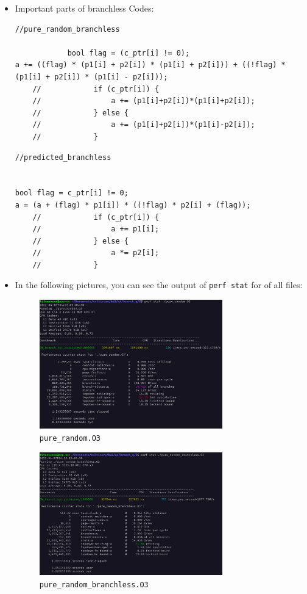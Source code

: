 \documentclass[12pt]{article}
\begin{document}
	\begin{itemize}
		\item 
			Important parts of branchless Codes:
		
		
		\begin{lstlisting}[style=CStyle]
			//pure_random_branchless
			
            bool flag = (c_ptr[i] != 0);
a += ((flag) * (p1[i] + p2[i]) * (p1[i] + p2[i])) + ((!flag) * (p1[i] + p2[i]) * (p1[i] - p2[i]));
	//            if (c_ptr[i]) {
	//                a += (p1[i]+p2[i])*(p1[i]+p2[i]);
	//            } else {
	//                a += (p1[i]+p2[i])*(p1[i]-p2[i]);
	//            }
		\end{lstlisting}
		
		
		\begin{lstlisting}[style=CStyle]
			//predicted_branchless
			

bool flag = c_ptr[i] != 0;
a = (a + (flag) * p1[i]) * ((!flag) * p2[i] + (flag));
	//            if (c_ptr[i]) {
	//                a += p1[i];
	//            } else {
	//                a *= p2[i];
	//            }
		\end{lstlisting}
	
	\item 
	In the following pictures, you can see the output of \Verb+perf stat+ for of all files:
	
	\begin{figure}[H]
		\centering
		\includegraphics[width=0.75\textwidth]{./images/4E/pure-random.png}	
		\cprotect\caption{\Verb+pure_random.O3+}
	\end{figure}
	
	
	\begin{figure}[H]
		\centering
		\includegraphics[width=0.75\textwidth]{./images/4E/pure-random-b.png}	
		\cprotect\caption{\Verb+pure_random_branchless.O3+}
	\end{figure}



\end{itemize}
\end{document}
